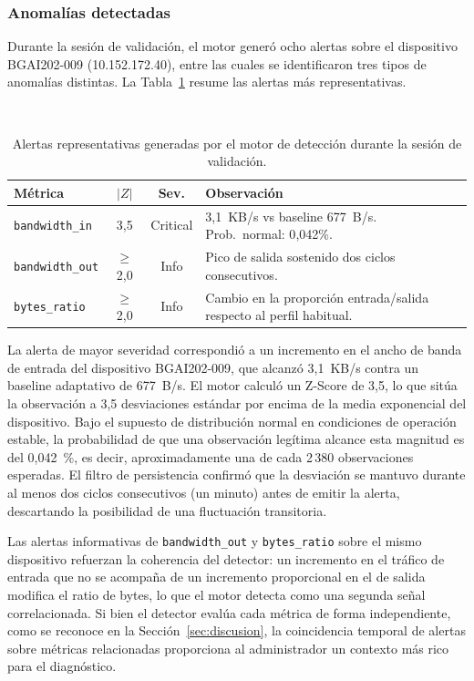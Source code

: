 \subsubsection{Anomalías detectadas}

Durante la sesión de validación, el motor generó ocho alertas
sobre el dispositivo BGAI202-009 (10.152.172.40), entre las
cuales se identificaron tres tipos de anomalías distintas. La
Tabla~\ref{tab:alertas-motor} resume las alertas más
representativas.

\begin{table}[H]
\centering
\caption{Alertas representativas generadas por el motor de
detección durante la sesión de validación.}
~\label{tab:alertas-motor}
\footnotesize
\begin{tabular}{@{}p{2.2cm}ccp{2.5cm}@{}}
\toprule
\textbf{Métrica} & $|Z|$ & \textbf{Sev.} & \textbf{Observación} \\
\midrule
\texttt{bandwidth\_in} & 3{,}5 & Critical &
  3{,}1~KB/s vs baseline 677~B/s. Prob.\ normal: 0{,}042\%. \\[3pt]
\texttt{bandwidth\_out} & $\geq$2{,}0 & Info &
  Pico de salida sostenido dos ciclos consecutivos. \\[3pt]
\texttt{bytes\_ratio} & $\geq$2{,}0 & Info &
  Cambio en la proporción entrada/salida respecto al perfil habitual. \\
\bottomrule
\end{tabular}
\end{table}

La alerta de mayor severidad correspondió a un incremento en el
ancho de banda de entrada del dispositivo BGAI202-009, que alcanzó
3{,}1~KB/s contra un baseline adaptativo de 677~B/s. El motor
calculó un Z-Score de 3{,}5, lo que sitúa la observación a 3{,}5
desviaciones estándar por encima de la media exponencial del
dispositivo. Bajo el supuesto de distribución normal en
condiciones de operación estable, la probabilidad de que una
observación legítima alcance esta magnitud es del 0{,}042~\%, es
decir, aproximadamente una de cada 2\,380 observaciones esperadas.
El filtro de persistencia confirmó que la desviación se mantuvo
durante al menos dos ciclos consecutivos (un minuto) antes de
emitir la alerta, descartando la posibilidad de una fluctuación
transitoria.

Las alertas informativas de \texttt{bandwidth\_out} y
\texttt{bytes\_ratio} sobre el mismo dispositivo refuerzan la
coherencia del detector: un incremento en el tráfico de entrada
que no se acompaña de un incremento proporcional en el de salida
modifica el ratio de bytes, lo que el motor detecta como una
segunda señal correlacionada. Si bien el detector evalúa cada
métrica de forma independiente, como se reconoce en la
Sección~\ref{sec:discusion}, la coincidencia temporal de alertas
sobre métricas relacionadas proporciona al administrador un
contexto más rico para el diagnóstico.

